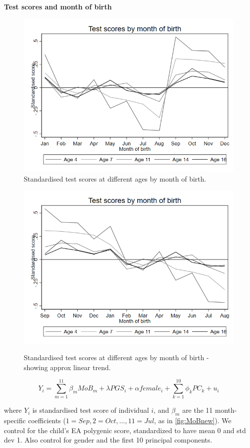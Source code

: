 \documentclass[a4paper,12pt]{article}
\begin{document}
\textbf{Test scores and month of birth}
\bigskip \bigskip

\vspace{3mm}

\begin{figure}[H]
\centering
\includegraphics[width=0.8\linewidth]{../figures/MoB.png}
\caption{Standardised test scores at different ages by month of birth.}
\end{figure}

\begin{figure}[H]
\centering \label{fig:MoBnew}
\includegraphics[width=0.8\linewidth]{../figures/MoBnew.png}
\caption{Standardised test scores at different ages by month of birth - showing approx linear trend.}
\end{figure}
\clearpage

\begin{equation*} 
Y_i = \sum_{m=1}^{11} \beta_m MoB_{m} + \lambda PGS_i + \alpha female_i + \sum_{k=1}^{10} \phi_k PC_k + u_i
\end{equation*} 

where $Y_{i}$ is standardised test score of individual $i$, and $\beta_m$ are the 11 month-specific coefficients ($1=Sep, 2=Oct, ..., 11=Jul$, as in \autoref{fig:MoBnew}). We control for the child's EA polygenic score, standardized to have mean 0 and std dev 1. Also control for gender and the first 10 principal components.
\end{document}
